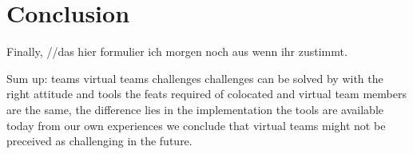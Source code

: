 \section{Conclusion}
\begin{multicols}{2}
Finally, 
//das hier formulier ich morgen noch aus wenn ihr zustimmt.

Sum up:
teams
virtual teams
challenges
challenges can be solved by with the right attitude and tools
the feats required of colocated and virtual team members are the same, the difference lies in the implementation
the tools are available today
from our own experiences we conclude that virtual teams might not be preceived as challenging in the future.
\end{multicols}